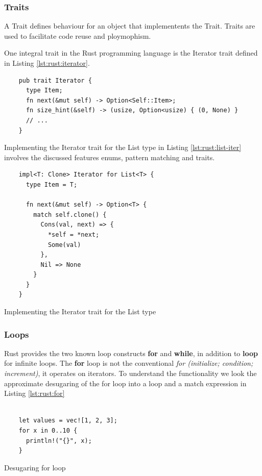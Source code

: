 \subsubsection{Traits}

A Trait defines behaviour for an object that implementents the Trait.
Traits are used to facilitate code reuse and ploymophism.

One integral trait in the Rust programming language is the Iterator trait defined in Listing \ref{lst:rust:iterator}.

\begin{listing}[H]
  \begin{verbatim}
    pub trait Iterator {
      type Item;
      fn next(&mut self) -> Option<Self::Item>;
      fn size_hint(&self) -> (usize, Option<usize) { (0, None) }
      // ...
    }
  \end{verbatim}
  \caption{}
  \label{lst:rust:iterator}
\end{listing}

Implementing the Iterator trait for the List type in Listing \ref{lst:rust:list-iter} involves the discussed features enums, pattern matching and traits.

\begin{listing}[H]
  \begin{verbatim}
    impl<T: Clone> Iterator for List<T> {
      type Item = T;

      fn next(&mut self) -> Option<T> {
        match self.clone() {
          Cons(val, next) => {
            *self = *next;
            Some(val)
          },
          Nil => None
        }
      }
    }
  \end{verbatim}
  \caption{Implementing the Iterator trait for the List type}
  \label{lst:rust:list-iter}
\end{listing}


\subsubsection{Loops}

Rust provides the two known loop constructs \textbf{for} and \textbf{while}, in addition to \textbf{loop} for infinite loops.
The \textbf{for} loop is not the conventional \textit{for (initialize; condition; increment)}, it operates on iterators.
To understand the functionality we look the approximate desugaring of the for loop into a loop and a match expression in Listing \ref{lst:rust:for}


\begin{minipage}[b]{0.5\linewidth}
  \begin{listing}[H]
  \begin{verbatim}

    let values = vec![1, 2, 3];
    for x in 0..10 {
      println!("{}", x);
    }

  \end{verbatim}
  \caption{Desugaring for loop}
  \label{lst:rust:for}
  \end{listing}
  \end{minipage}

